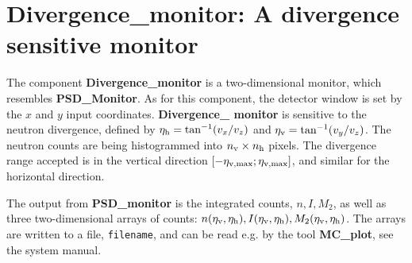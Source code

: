 
\section{Divergence\_monitor: A divergence sensitive monitor}
\label{s:div-monitor}

The component {\bf Divergence\_monitor} is a two-dimensional monitor,
which resembles {\bf PSD\_Monitor}. As for this component,
the detector window is set
by the $x$ and $y$ input coordinates.
{\bf Divergence\_ monitor} is sensitive to the neutron divergence,
defined by
$\eta_{\rm h} = \tan^{-1}(v_x/v_z)$ and $\eta_{\rm v} = \tan^{-1}(v_y/v_z)$.
The neutron counts are being histogrammed
into $n_{\rm v} \times n_{\rm h}$ pixels. 
The divergence range accepted is in the vertical direction
$[-\eta_{\rm v,max}; \eta_{\rm v,max}]$, and similar for the horizontal
direction.

The output from {\bf PSD\_monitor} is the integrated counts, $n, I, M_2$,
as well as
three two-dimensional arrays of counts: $n(\eta_{\rm v},\eta_{\rm h}),
I(\eta_{\rm v},\eta_{\rm h}), M_2(\eta_{\rm v},\eta_{\rm h})$.
The arrays are written to a file, \verb+filename+, 
and can be read e.g. by the tool {\bf MC\_plot}, see the system manual.
